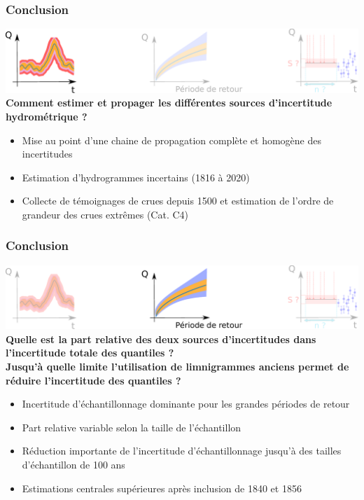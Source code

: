 \documentclass[compress,9pt]{beamer}
\begin{document}
	\begin{frame}[t]
		\frametitle{Conclusion}
		\centering
		\includegraphics[width = .95\textwidth]{./Figures/SchemaConclu1.pdf} 
		\vfill
		\textbf{Comment estimer et propager les différentes sources d'incertitude hydrométrique ?}\\
		\vfill
		\begin{itemize}
			\item<1->[$\vartriangleright$] Mise au point d'une chaine de propagation complète et homogène des incertitudes 
			\vspace{5pt}
			\item<2->[$\vartriangleright$] Estimation d'hydrogrammes incertains (1816 à 2020)
			\vspace{5pt}			
			\item<3->[$\vartriangleright$] Collecte de témoignages de crues depuis 1500 et estimation de l'ordre de grandeur des crues extrêmes (Cat. C4)
		\end{itemize}
	\end{frame}
	
	\begin{frame}[t]
		\frametitle{Conclusion}
		\centering
		\includegraphics[width = .95\textwidth]{./Figures/SchemaConclu2.pdf} 
		\vfill
		\textbf{Quelle est la part relative des deux sources d'incertitudes dans l'incertitude totale des
quantiles ?}\\
\vspace{5pt}
		\textbf{Jusqu'à quelle limite l'utilisation de limnigrammes anciens permet de réduire l'incertitude des quantiles ?}\\
		\vfill
		\begin{itemize}
			\item<1->[$\vartriangleright$] Incertitude d'échantillonnage dominante pour les grandes périodes de retour
			\vspace{5pt}
			\item<2->[$\vartriangleright$] Part relative variable selon la taille de l'échantillon
			\vspace{5pt}
			\item<3->[$\vartriangleright$] Réduction importante de l'incertitude d'échantillonnage jusqu'à des tailles d'échantillon de 100 ans
			\vspace{5pt}
			\item<4->[$\vartriangleright$] Estimations centrales supérieures après inclusion de 1840 et 1856
		\end{itemize}
	\end{frame}
	
\end{document}
